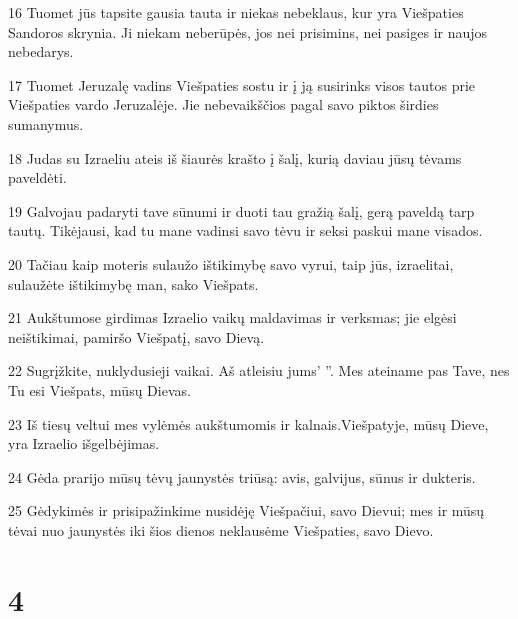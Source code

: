 \par 16 Tuomet jūs tapsite gausia tauta ir niekas nebeklaus, kur yra Viešpaties Sandoros skrynia. Ji niekam neberūpės, jos nei prisimins, nei pasiges ir naujos nebedarys. 
\par 17 Tuomet Jeruzalę vadins Viešpaties sostu ir į ją susirinks visos tautos prie Viešpaties vardo Jeruzalėje. Jie nebevaikščios pagal savo piktos širdies sumanymus. 
\par 18 Judas su Izraeliu ateis iš šiaurės krašto į šalį, kurią daviau jūsų tėvams paveldėti. 
\par 19 Galvojau padaryti tave sūnumi ir duoti tau gražią šalį, gerą paveldą tarp tautų. Tikėjausi, kad tu mane vadinsi savo tėvu ir seksi paskui mane visados. 
\par 20 Tačiau kaip moteris sulaužo ištikimybę savo vyrui, taip jūs, izraelitai, sulaužėte ištikimybę man,­ sako Viešpats.­ 
\par 21 Aukštumose girdimas Izraelio vaikų maldavimas ir verksmas; jie elgėsi neištikimai, pamiršo Viešpatį, savo Dievą. 
\par 22 Sugrįžkite, nuklydusieji vaikai. Aš atleisiu jums’ ”. Mes ateiname pas Tave, nes Tu esi Viešpats, mūsų Dievas. 
\par 23 Iš tiesų veltui mes vylėmės aukštumomis ir kalnais.Viešpatyje, mūsų Dieve, yra Izraelio išgelbėjimas. 
\par 24 Gėda prarijo mūsų tėvų jaunystės triūsą: avis, galvijus, sūnus ir dukteris. 
\par 25 Gėdykimės ir prisipažinkime nusidėję Viešpačiui, savo Dievui; mes ir mūsų tėvai nuo jaunystės iki šios dienos neklausėme Viešpaties, savo Dievo.



\chapter{4}


